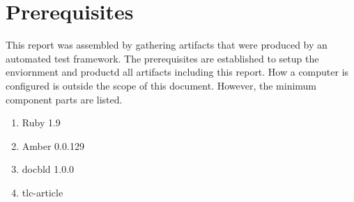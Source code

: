 \section{Prerequisites}
This report was assembled by gathering artifacts that were produced by an
automated test framework.  The prerequisites are established to setup the
enviornment and productd all artifacts including this report.  How a computer is
configured is outside the scope of this document.  However, the minimum
component parts are listed.

\begin{enumerate}

\item Ruby 1.9
\item Amber 0.0.129
\item docbld 1.0.0
\item tlc-article

\end{enumerate}
